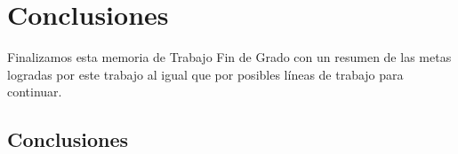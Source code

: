 \chapter{Conclusiones}
\label{cap:capitulo7}

Finalizamos esta memoria de Trabajo Fin de Grado con un resumen de las metas logradas por este trabajo al igual que por posibles líneas de trabajo para continuar.

\section{Conclusiones}
